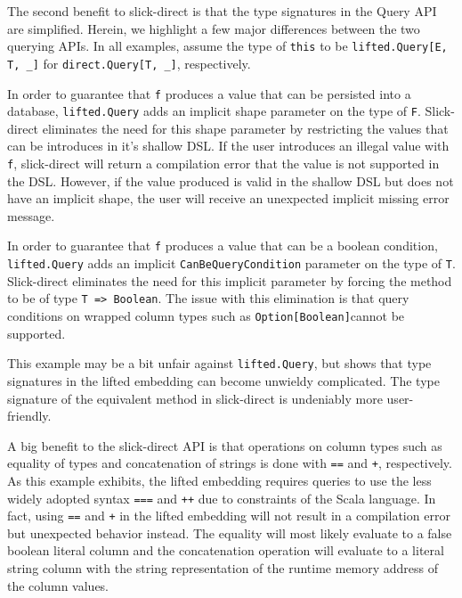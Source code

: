 The second benefit to slick-direct is that the type signatures in the Query API are simplified.
Herein, we highlight a few major differences between the two querying APIs.
In all examples, assume the type of \texttt{this} to be \texttt{lifted.Query[E, T, \_]} for \texttt{direct.Query[T, \_]}, respectively.

In order to guarantee that \texttt{f} produces a value that can be persisted into a database, \texttt{lifted.Query} adds an implicit shape parameter on the type of \texttt{F}.
Slick-direct eliminates the need for this shape parameter by restricting the values that can be introduces in it's shallow DSL.
If the user introduces an illegal value with \texttt{f}, slick-direct will return a compilation error that the value is not supported in the DSL.
However, if the value produced is valid in the shallow DSL but does not have an implicit shape, the user will receive an unexpected implicit missing error message.


In order to guarantee that \texttt{f} produces a value that can be a boolean condition, \texttt{lifted.Query} adds an implicit \texttt{CanBeQueryCondition} parameter on the type of \texttt{T}.
Slick-direct eliminates the need for this implicit parameter by forcing the method to be of type \texttt{T => Boolean}.
The issue with this elimination is that query conditions on wrapped column types such as \texttt{Option[Boolean]}cannot be supported.


This example may be a bit unfair against \texttt{lifted.Query}, but shows that type signatures in the lifted embedding can become unwieldy complicated.
The type signature of the equivalent method in slick-direct is undeniably more user-friendly.


A big benefit to the slick-direct API is that operations on column types such as equality of types and concatenation of strings is done with \texttt{==} and \texttt{+}, respectively.
As this example exhibits, the lifted embedding requires queries to use the less widely adopted syntax \texttt{===} and \texttt{++} due to constraints of the Scala language.
In fact, using \texttt{==} and \texttt{+} in the lifted embedding will not result in a compilation error but unexpected behavior instead.
The equality will most likely evaluate to a false boolean literal column and the concatenation operation will evaluate to a literal string column with the string representation of the runtime memory address of the column values.

